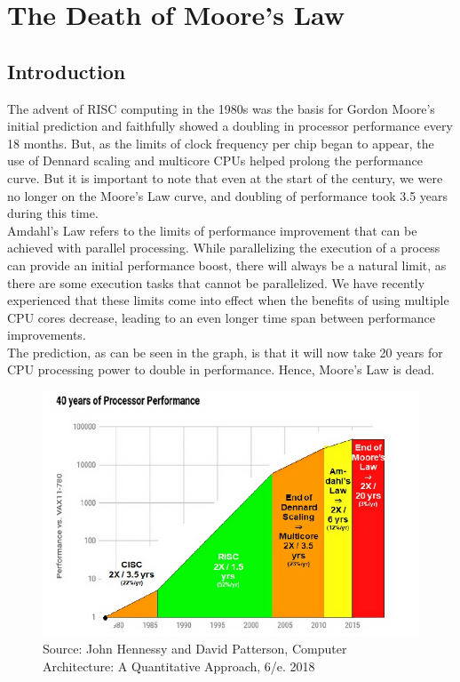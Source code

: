 \chapter{The Death of Moore’s Law}\label{ch:3}
\section{Introduction}

The advent of RISC computing in the 1980s was the basis for Gordon Moore's initial prediction and faithfully showed a doubling in processor performance every 18 months. But, as the limits of clock frequency per chip began to appear, the use of Dennard scaling and multicore CPUs helped prolong the performance curve. But it is important to note that even at the start of the century, we were no longer on the Moore's Law curve, and doubling of performance took 3.5 years during this time. \\

Amdahl's Law refers to the limits of performance improvement that can be achieved with parallel processing. While parallelizing the execution of a process can provide an initial performance boost, there will always be a natural limit, as there are some execution tasks that cannot be parallelized. We have recently experienced that these limits come into effect when the benefits of using multiple CPU cores decrease, leading to an even longer time span between performance improvements. \\
The prediction, as can be seen in the graph, is that it will now take 20 years for CPU processing power to double in performance. Hence, Moore's Law is dead. \\

\pagebreak

\begin{figure}[h]
    \centering
    \includegraphics[scale=0.7]{figures/processor-performance.png}
    \caption{Source: John Hennessy and David Patterson, Computer Architecture: A Quantitative Approach, 6/e. 2018}
    \label{fig:gp}
\end{figure}

